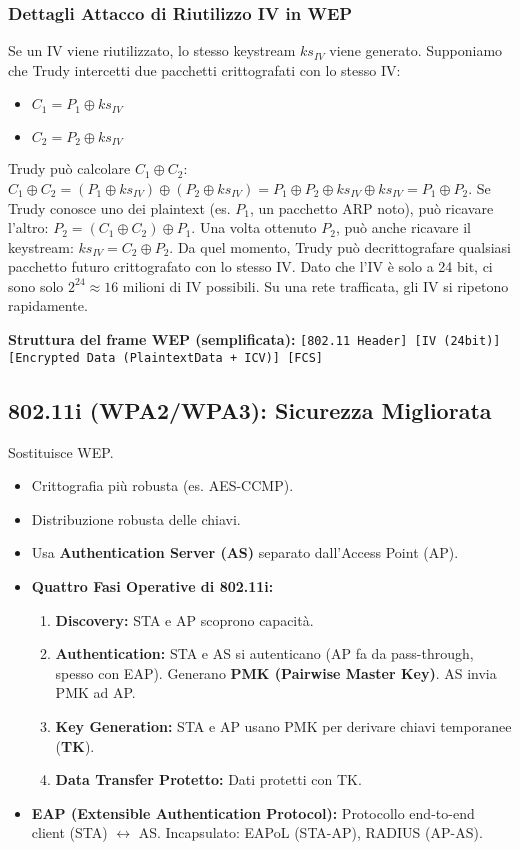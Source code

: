 \subsubsection{Dettagli Attacco di Riutilizzo IV in WEP}
\label{ssubsec:wep_iv_reuse_attack}
Se un IV viene riutilizzato, lo stesso keystream $ks_{IV}$ viene generato.
Supponiamo che Trudy intercetti due pacchetti crittografati con lo stesso IV:
\begin{itemize}
    \item $C_1 = P_1 \oplus ks_{IV}$
    \item $C_2 = P_2 \oplus ks_{IV}$
\end{itemize}
Trudy può calcolare $C_1 \oplus C_2$:
$C_1 \oplus C_2 = (P_1 \oplus ks_{IV}) \oplus (P_2 \oplus ks_{IV}) = P_1 \oplus P_2 \oplus ks_{IV} \oplus ks_{IV} = P_1 \oplus P_2$.
Se Trudy conosce uno dei plaintext (es. $P_1$, un pacchetto ARP noto), può ricavare l'altro:
$P_2 = (C_1 \oplus C_2) \oplus P_1$.
Una volta ottenuto $P_2$, può anche ricavare il keystream: $ks_{IV} = C_2 \oplus P_2$.
Da quel momento, Trudy può decrittografare qualsiasi pacchetto futuro crittografato con lo stesso IV.
Dato che l'IV è solo a 24 bit, ci sono solo $2^{24} \approx 16$ milioni di IV possibili. Su una rete trafficata, gli IV si ripetono rapidamente.

\textbf{Struttura del frame WEP (semplificata):}
\texttt{[802.11 Header] [IV (24bit)] [Encrypted Data (PlaintextData + ICV)] [FCS]}

\subsection{802.11i (WPA2/WPA3): Sicurezza Migliorata}
Sostituisce WEP.
\begin{itemize}
    \item Crittografia più robusta (es. AES-CCMP).
    \item Distribuzione robusta delle chiavi.
    \item Usa \textbf{Authentication Server (AS)} separato dall'Access Point (AP).
    \item \textbf{Quattro Fasi Operative di 802.11i:}
    \begin{enumerate}
        \item \textbf{Discovery:} STA e AP scoprono capacità.
        \item \textbf{Authentication:} STA e AS si autenticano (AP fa da pass-through, spesso con EAP). Generano \textbf{PMK (Pairwise Master Key)}. AS invia PMK ad AP.
        \item \textbf{Key Generation:} STA e AP usano PMK per derivare chiavi temporanee (\textbf{TK}).
        \item \textbf{Data Transfer Protetto:} Dati protetti con TK.
    \end{enumerate}
    \item \textbf{EAP (Extensible Authentication Protocol):} Protocollo end-to-end client (STA) $\leftrightarrow$ AS.
    Incapsulato: EAPoL (STA-AP), RADIUS (AP-AS).
\end{itemize}

